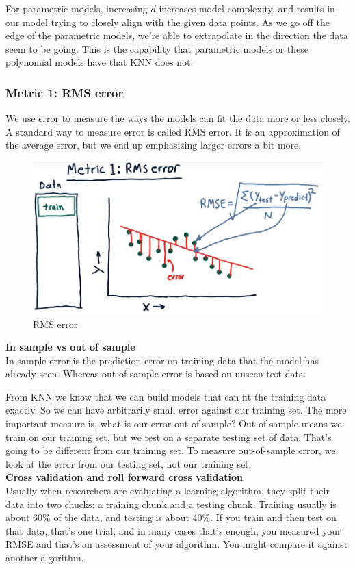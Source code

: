 \documentclass[12pt]{article}
\begin{document}
For parametric models, increasing $d$ increases model complexity, and results in our model trying to closely align with the given data points. As we go off the edge of the parametric models, we're able to extrapolate in the direction the data seem to be going. This is the capability that parametric models or these polynomial models have that KNN does not. 

\subsubsection{Metric 1: RMS error}

We use error to measure the ways the models can fit the data more or less closely. A standard way to measure error is called RMS error. It is an approximation of the average error, but we end up emphasizing larger errors a bit more. 

\begin{figure}[!ht]
\centering
\includegraphics[scale=0.35]{fig/fig87}
\caption{RMS error}
\end{figure}

\noindent
\textbf{In sample vs out of sample}\\
In-sample error is the prediction error on training data that the model has already seen. Whereas out-of-sample error is based on unseen test data.

From KNN we know that we can build models that can fit the training data exactly. So we can have arbitrarily small error against our training set. The more important measure is, what is our error out of sample? Out-of-sample means we train on our training set, but we test on a separate testing set of data. That's going to be different from our training set. To measure out-of-sample error, we look at the error from our testing set, not our training set. \\ [8pt]
\noindent
\textbf{Cross validation and roll forward cross validation} \\
Usually when researchers are evaluating a learning algorithm, they split their data into two chucks: a training chunk and a testing chunk. Training usually is about 60\% of the data, and testing is about 40\%. If you train and then test on that data, that's one trial, and in many cases that's enough, you measured your RMSE and that's an assessment of your algorithm. You might compare it against another algorithm. 
\end{document}
